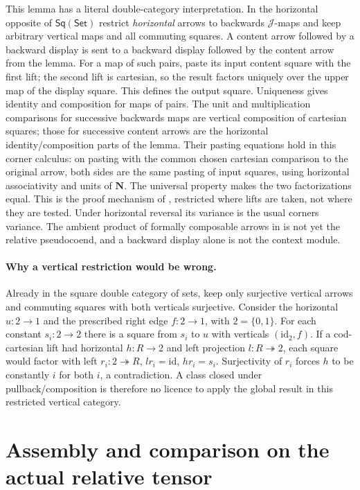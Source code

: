 \documentclass[11pt]{article}
\theoremstyle{definition}
\newcommand{\Set}{\mathsf{Set}}
\newcommand{\J}{\mathcal J}
\newcommand{\id}{\mathrm{id}}
\newcommand{\Sq}{\mathsf{Sq}}
\begin{document}
This lemma has a literal double-category interpretation. In the
horizontal opposite of $\Sq(\Set)$ restrict \emph{horizontal} arrows
to backwards $\J$-maps and keep arbitrary vertical maps and all
commuting squares. A content arrow followed by a backward display is
sent to a backward display followed by the content arrow from the lemma.
For a map of such pairs, paste its input content square with the
first lift; the second lift is cartesian, so the result factors uniquely
over the upper map of the display square. This defines the output square.
Uniqueness gives identity and composition for maps of pairs.
The unit and multiplication comparisons for successive backwards maps
are vertical composition of cartesian squares; those for successive
content arrows are the horizontal identity/composition parts of the lemma.
Their pasting equations hold in this corner calculus: on pasting with
the common chosen cartesian comparison to the original arrow, both sides
are the same pasting of input squares, using horizontal associativity and
units of $\mathbf N$. The universal property makes the two factorizations
equal. This is the proof mechanism of \cite[Def.~6.1, Prop.~6.3]{BG},
restricted where lifts are taken, not where they are tested. Under
horizontal reversal its variance is the usual corners variance.
The ambient product of formally composable arrows in
\cite[Def.~3.2 and Sec.~3.2]{BG} is not yet the relative
pseudocoend, and a backward display alone is not the context module.

\paragraph{Why a vertical restriction would be wrong.}
Already in the square double category of sets, keep only surjective
vertical arrows and commuting squares with both verticals surjective.
Consider the horizontal $u:2\to1$ and the prescribed right edge
$f:2\to1$, with $2=\{0,1\}$. For each constant $s_i:2\to2$ there is
a square from $s_i$ to $u$ with verticals $(\id_2,f)$. If a
cod-cartesian lift had horizontal $h:R\to 2$ and left projection
$l:R\twoheadrightarrow 2$, each square would factor with left
$r_i:2\twoheadrightarrow R$, $l r_i=\id$, $h r_i=s_i$. Surjectivity
of $r_i$ forces $h$ to be constantly $i$ for both $i$, a contradiction.
A class closed under pullback/composition is therefore no licence to
apply the global result in this restricted vertical category.

\section{Assembly and comparison on the actual relative tensor}
\end{document}
